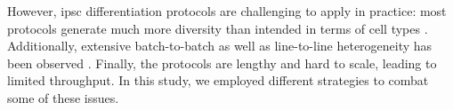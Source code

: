 However, \gls{ipsc} differentiation protocols are challenging to apply in practice: most protocols generate much more diversity than intended in terms of cell types 
\cite{bock2011reference}.
Additionally, extensive batch-to-batch as well as line-to-line heterogeneity has been observed \cite{schwartzentruber2018molecular, carcamo2017analysis}. 
Finally, the protocols are lengthy and hard to scale, leading to limited throughput.
In this study, we employed different strategies to combat some of these issues.





